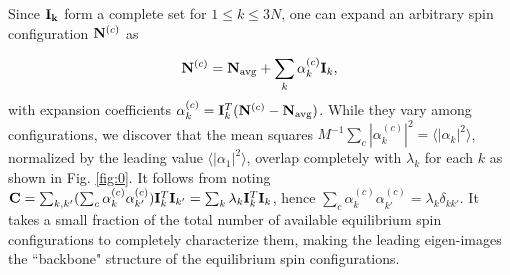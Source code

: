 \documentclass[reprint,amsmath,amssymb,aps,showpacs,superscriptaddress,prl]{revtex4-1}
\newcommand{\ba}{\begin{eqnarray}}
\newcommand{\ea}{\end{eqnarray}}
\renewcommand{\v}[1]{{\bf #1}}
\begin{document}
Since $\bf I_k$ form a complete set for $1 \le k \le 3N$, one can expand an arbitrary spin configuration $\v N^{(c)}$ as

\ba \v N^{(c)} = \v N_{\rm avg} + \sum_k \alpha_k^{(c)} {\bf I}_k , \label{eq:alpha_k}\ea
with expansion coefficients $\alpha_k^{(c)} = {\bf I}_k^T (\v N^{(c)} - \v N_{\rm avg} )$. While they vary among configurations, we discover that the mean squares $M^{-1} \sum_c |\alpha_k^{(c)} |^2 = \langle | \alpha_k |^2 \rangle $, normalized by the leading value $\langle |\alpha_1 |^2 \rangle$, overlap completely with $\lambda_k$ for each $k$ as shown in Fig. \ref{fig:0}.
It follows from noting ${\bf C} = \sum_{k,k'}  ( \sum_c \alpha_k^{(c)} \alpha_{k'}^{(c)} ) {\bf I}_k^T {\bf I}_{k'} = \sum_k \lambda_k {\bf I}_k^T {\bf I}_k$, hence $\sum_c \alpha_k^{(c)} \alpha_{k'}^{(c)}  = \lambda_k \delta_{kk'}$. It takes a small fraction of the total number of available equilibrium spin configurations to completely characterize them, making the leading eigen-images the ``backbone" structure of the equilibrium spin configurations.
\end{document}
